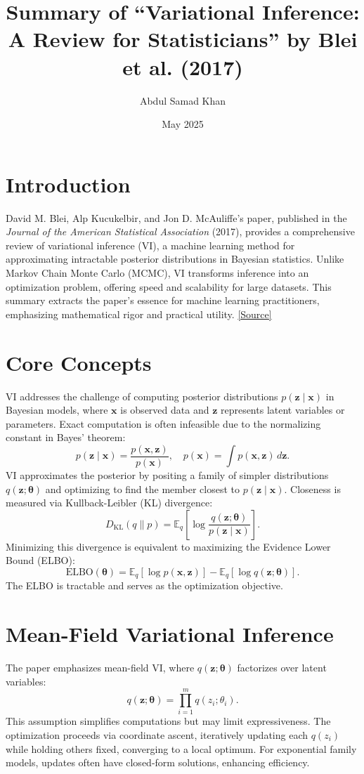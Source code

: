 \documentclass[11pt]{article}
\title{Summary of ``Variational Inference: A Review for Statisticians'' by Blei et al. (2017)}
\author{Abdul Samad Khan}
\date{May 2025}
\begin{document}
\maketitle

\section{Introduction}
David M. Blei, Alp Kucukelbir, and Jon D. McAuliffe’s paper, published in the \textit{Journal of the American Statistical Association} (2017), provides a comprehensive review of variational inference (VI), a machine learning method for approximating intractable posterior distributions in Bayesian statistics. Unlike Markov Chain Monte Carlo (MCMC), VI transforms inference into an optimization problem, offering speed and scalability for large datasets. This summary extracts the paper’s essence for machine learning practitioners, emphasizing mathematical rigor and practical utility. \href{https://doi.org/10.1080/01621459.2017.1285773}{[Source]}

\section{Core Concepts}
VI addresses the challenge of computing posterior distributions $p(\mathbf{z} \mid \mathbf{x})$ in Bayesian models, where $\mathbf{x}$ is observed data and $\mathbf{z}$ represents latent variables or parameters. Exact computation is often infeasible due to the normalizing constant in Bayes’ theorem:
\[
p(\mathbf{z} \mid \mathbf{x}) = \frac{p(\mathbf{x}, \mathbf{z})}{p(\mathbf{x})}, \quad p(\mathbf{x}) = \int p(\mathbf{x}, \mathbf{z}) \, d\mathbf{z}.
\]
VI approximates the posterior by positing a family of simpler distributions $q(\mathbf{z}; \boldsymbol{\theta})$ and optimizing to find the member closest to $p(\mathbf{z} \mid \mathbf{x})$. Closeness is measured via Kullback-Leibler (KL) divergence:
\[
D_{\text{KL}}(q \parallel p) = \mathbb{E}_{q} \left[ \log \frac{q(\mathbf{z}; \boldsymbol{\theta})}{p(\mathbf{z} \mid \mathbf{x})} \right].
\]
Minimizing this divergence is equivalent to maximizing the Evidence Lower Bound (ELBO):
\[
\text{ELBO}(\boldsymbol{\theta}) = \mathbb{E}_{q} [\log p(\mathbf{x}, \mathbf{z})] - \mathbb{E}_{q} [\log q(\mathbf{z}; \boldsymbol{\theta})].
\]
The ELBO is tractable and serves as the optimization objective.

\section{Mean-Field Variational Inference}
The paper emphasizes mean-field VI, where $q(\mathbf{z}; \boldsymbol{\theta})$ factorizes over latent variables:
\[
q(\mathbf{z}; \boldsymbol{\theta}) = \prod_{i=1}^m q(z_i; \theta_i).
\]
This assumption simplifies computations but may limit expressiveness. The optimization proceeds via coordinate ascent, iteratively updating each $q(z_i)$ while holding others fixed, converging to a local optimum. For exponential family models, updates often have closed-form solutions, enhancing efficiency.
\end{document}
